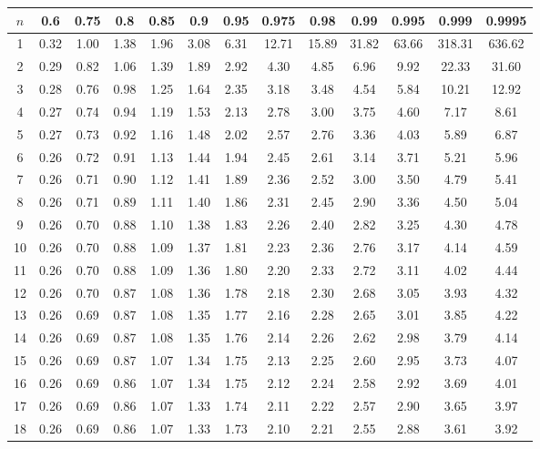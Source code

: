 \setlength{\tabcolsep}{3pt}
\renewcommand{\arraystretch}{1}
\begin{center}
\begin{tabular}{c | c c c c c c c c c c c c}
$n$ & 0.6 & 0.75 & 0.8 & 0.85 & 0.9 & 0.95 & 0.975 & 0.98 & 0.99 & 0.995 & 0.999 & 0.9995 \\
\hline
1 & 0.32 & 1.00 & 1.38 & 1.96 & 3.08 & 6.31 & 12.71 & 15.89 & 31.82 & 63.66 & 318.31 & 636.62 \\
2 & 0.29 & 0.82 & 1.06 & 1.39 & 1.89 & 2.92 & 4.30 & 4.85 & 6.96 & 9.92 & 22.33 & 31.60 \\
3 & 0.28 & 0.76 & 0.98 & 1.25 & 1.64 & 2.35 & 3.18 & 3.48 & 4.54 & 5.84 & 10.21 & 12.92 \\
4 & 0.27 & 0.74 & 0.94 & 1.19 & 1.53 & 2.13 & 2.78 & 3.00 & 3.75 & 4.60 & 7.17 & 8.61 \\
5 & 0.27 & 0.73 & 0.92 & 1.16 & 1.48 & 2.02 & 2.57 & 2.76 & 3.36 & 4.03 & 5.89 & 6.87 \\
6 & 0.26 & 0.72 & 0.91 & 1.13 & 1.44 & 1.94 & 2.45 & 2.61 & 3.14 & 3.71 & 5.21 & 5.96 \\
7 & 0.26 & 0.71 & 0.90 & 1.12 & 1.41 & 1.89 & 2.36 & 2.52 & 3.00 & 3.50 & 4.79 & 5.41 \\
8 & 0.26 & 0.71 & 0.89 & 1.11 & 1.40 & 1.86 & 2.31 & 2.45 & 2.90 & 3.36 & 4.50 & 5.04 \\
9 & 0.26 & 0.70 & 0.88 & 1.10 & 1.38 & 1.83 & 2.26 & 2.40 & 2.82 & 3.25 & 4.30 & 4.78 \\
10 & 0.26 & 0.70 & 0.88 & 1.09 & 1.37 & 1.81 & 2.23 & 2.36 & 2.76 & 3.17 & 4.14 & 4.59 \\
11 & 0.26 & 0.70 & 0.88 & 1.09 & 1.36 & 1.80 & 2.20 & 2.33 & 2.72 & 3.11 & 4.02 & 4.44 \\
12 & 0.26 & 0.70 & 0.87 & 1.08 & 1.36 & 1.78 & 2.18 & 2.30 & 2.68 & 3.05 & 3.93 & 4.32 \\
13 & 0.26 & 0.69 & 0.87 & 1.08 & 1.35 & 1.77 & 2.16 & 2.28 & 2.65 & 3.01 & 3.85 & 4.22 \\
14 & 0.26 & 0.69 & 0.87 & 1.08 & 1.35 & 1.76 & 2.14 & 2.26 & 2.62 & 2.98 & 3.79 & 4.14 \\
15 & 0.26 & 0.69 & 0.87 & 1.07 & 1.34 & 1.75 & 2.13 & 2.25 & 2.60 & 2.95 & 3.73 & 4.07 \\
16 & 0.26 & 0.69 & 0.86 & 1.07 & 1.34 & 1.75 & 2.12 & 2.24 & 2.58 & 2.92 & 3.69 & 4.01 \\
17 & 0.26 & 0.69 & 0.86 & 1.07 & 1.33 & 1.74 & 2.11 & 2.22 & 2.57 & 2.90 & 3.65 & 3.97 \\
18 & 0.26 & 0.69 & 0.86 & 1.07 & 1.33 & 1.73 & 2.10 & 2.21 & 2.55 & 2.88 & 3.61 & 3.92 \\

\end{tabular}
\end{center}
